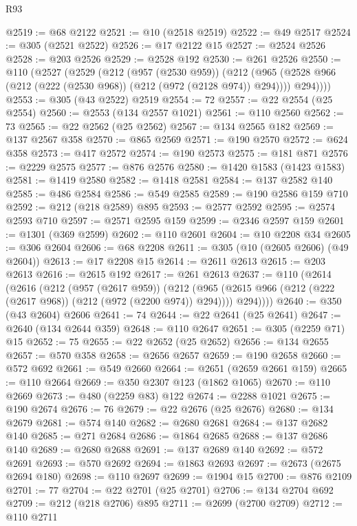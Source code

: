 \begin{lexlean}{R93}
\begin{coremodule}
@2519 := @68 @2122
@2521 := @10 (@2518 @2519)
@2522 := @49 @2517
@2524 := @305 (@2521 @2522)
@2526 := @17 @2122 @15
@2527 := @2524 @2526
@2528 := @203 @2526
@2529 := @2528 @192
@2530 := @261 @2526
@2550 := @110
    (@2527
      (@2529
        (@212
          (@957 (@2530 @959))
          (@212
            (@965 (@2528 @966 (@212 (@222 (@2530 @968)) (@212 (@972 (@2128 @974)) @294))))
            @294))))
@2553 := @305 (@43 @2522) @2519
@2554 := 72
@2557 := @22 @2554 (@25 @2554)
@2560 := @2553 (@134 @2557 @1021)
@2561 := @110 @2560
@2562 := 73
@2565 := @22 @2562 (@25 @2562)
@2567 := @134 @2565 @182
@2569 := @137 @2567 @358
@2570 := @865 @2569
@2571 := @190 @2570
@2572 := @624 @358
@2573 := @417 @2572
@2574 := @190 @2573
@2575 := @181 @871
@2576 := @2229 @2575
@2577 := @876 @2576
@2580 := @1420 @1583 (@1423 @1583)
@2581 := @1419 @2580
@2582 := @1418 @2581
@2584 := @137 @2582 @140
@2585 := @486 @2584
@2586 := @549 @2585
@2589 := @190 @2586 @159 @710
@2592 := @212 (@218 @2589) @895
@2593 := @2577 @2592
@2595 := @2574 @2593 @710
@2597 := @2571 @2595 @159
@2599 := @2346 @2597 @159
@2601 := @1301 (@369 @2599)
@2602 := @110 @2601
@2604 := @10 @2208 @34
@2605 := @306 @2604
@2606 := @68 @2208
@2611 := @305 (@10 (@2605 @2606) (@49 @2604))
@2613 := @17 @2208 @15
@2614 := @2611 @2613
@2615 := @203 @2613
@2616 := @2615 @192
@2617 := @261 @2613
@2637 := @110
    (@2614
      (@2616
        (@212
          (@957 (@2617 @959))
          (@212
            (@965 (@2615 @966 (@212 (@222 (@2617 @968)) (@212 (@972 (@2200 @974)) @294))))
            @294))))
@2640 := @350 (@43 @2604) @2606
@2641 := 74
@2644 := @22 @2641 (@25 @2641)
@2647 := @2640 (@134 @2644 @359)
@2648 := @110 @2647
@2651 := @305 (@2259 @71) @15
@2652 := 75
@2655 := @22 @2652 (@25 @2652)
@2656 := @134 @2655
@2657 := @570 @358
@2658 := @2656 @2657
@2659 := @190 @2658
@2660 := @572 @692
@2661 := @549 @2660
@2664 := @2651 (@2659 @2661 @159)
@2665 := @110 @2664
@2669 := @350 @2307 @123 (@1862 @1065)
@2670 := @110 @2669
@2673 := @480 (@2259 @83) @122
@2674 := @2288 @1021
@2675 := @190 @2674
@2676 := 76
@2679 := @22 @2676 (@25 @2676)
@2680 := @134 @2679
@2681 := @574 @140
@2682 := @2680 @2681
@2684 := @137 @2682 @140
@2685 := @271 @2684
@2686 := @1864 @2685
@2688 := @137 @2686 @140
@2689 := @2680 @2688
@2691 := @137 @2689 @140
@2692 := @572 @2691
@2693 := @570 @2692
@2694 := @1863 @2693
@2697 := @2673 (@2675 @2694 @180)
@2698 := @110 @2697
@2699 := @1904 @15
@2700 := @876 @2109
@2701 := 77
@2704 := @22 @2701 (@25 @2701)
@2706 := @134 @2704 @692
@2709 := @212 (@218 @2706) @895
@2711 := @2699 (@2700 @2709)
@2712 := @110 @2711

\end{coremodule}
\end{lexlean}
